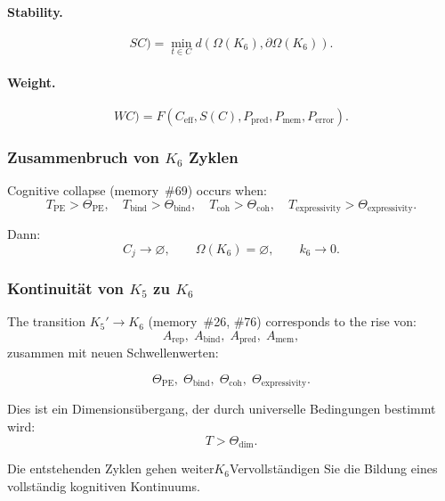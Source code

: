 \paragraph{Stability.}
\[
SC)
  = \min_{t\in C}
    d(\Omega(K_6),\partial\Omega(K_6)).
\]

\paragraph{Weight.}
\[
WC)
 = F(C_{\mathrm{eff}}, S(C), P_{\mathrm{pred}},
      P_{\mathrm{mem}}, P_{\mathrm{error}}).
\]

\subsubsection{Zusammenbruch von \texorpdfstring{$K_6$}{K_6} Zyklen}

Cognitive collapse (memory~\#69) occurs when:
\[
  T_{\mathrm{PE}}>\Theta_{\mathrm{PE}},
  \quad
  T_{\mathrm{bind}}>\Theta_{\mathrm{bind}},
  \quad
  T_{\mathrm{coh}}>\Theta_{\mathrm{coh}},
  \quad
  T_{\mathrm{expressivity}}>\Theta_{\mathrm{expressivity}}.
\]

Dann:
\[
 C_j \to \varnothing,
 \qquad
 \Omega(K_6)=\varnothing,
 \qquad
 k_6\to 0.
\]

\subsubsection{Kontinuität von \texorpdfstring{$K_5$}{K_5} zu \texorpdfstring{$K_6$}{K_6}}

The transition $K_5' \to K_6$ (memory~\#26, \#76) corresponds to the rise
von:
\[
 A_{\mathrm{rep}},\;
 A_{\mathrm{bind}},\;
 A_{\mathrm{pred}},\;
 A_{\mathrm{mem}},
\]
zusammen mit neuen Schwellenwerten:

\[
 \Theta_{\mathrm{PE}},\;
 \Theta_{\mathrm{bind}},\;
 \Theta_{\mathrm{coh}},\;
 \Theta_{\mathrm{expressivity}}.
\]

Dies ist ein Dimensionsübergang, der durch universelle Bedingungen bestimmt wird:
\[
  T > \Theta_{\mathrm{dim}}.
\]

Die entstehenden Zyklen gehen weiter$K_6$Vervollständigen Sie die Bildung eines vollständig kognitiven Kontinuums.

